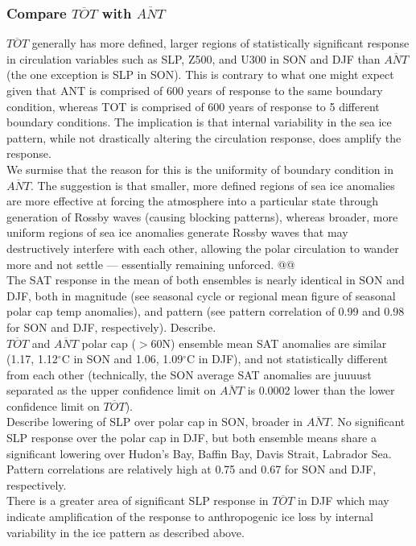 \documentclass[twocol]{ametsoc}
\begin{document}
\subsubsection{Compare $\overline{TOT}$ with $\overline{ANT}$}

$\overline{TOT}$ generally has more defined, larger regions of statistically significant response in circulation variables such as SLP, Z500, and U300 in SON and DJF than $\overline{ANT}$ (the one exception is SLP in SON). This is contrary to what one might expect given that ANT is comprised of 600 years of response to the same boundary condition, whereas TOT is comprised of 600 years of response to 5 different boundary conditions. The implication is that internal variability in the sea ice pattern, while not drastically altering the circulation response, does amplify the response.\\

We surmise that the reason for this is the uniformity of boundary condition in $\overline{ANT}$. The suggestion is that smaller, more defined regions of sea ice anomalies are more effective at forcing the atmosphere into a particular state through generation of Rossby waves (causing blocking patterns), whereas broader, more uniform regions of sea ice anomalies generate Rossby waves that may destructively interfere with each other, allowing the polar circulation to wander more and not settle --- essentially remaining unforced. @@\\

The SAT response in the mean of both ensembles is nearly identical in SON and DJF, both in magnitude (see seasonal cycle or regional mean figure of seasonal polar cap temp anomalies), and pattern (see pattern correlation of 0.99 and 0.98 for SON and DJF, respectively). Describe.\\
$\overline{TOT}$ and $\overline{ANT}$ polar cap ($>$60N) ensemble mean SAT anomalies are similar (1.17, 1.12$^\circ$C in SON and 1.06, 1.09$^\circ$C in DJF), and not statistically different from each other (technically, the SON average SAT anomalies are juuuust separated as the upper confidence limit on $\overline{ANT}$ is 0.0002 lower than the lower confidence limit on $\overline{TOT}$).\\ 

Describe lowering of SLP over polar cap in SON, broader in $\overline{ANT}$. No significant SLP response over the polar cap in DJF, but both ensemble means share a significant lowering over Hudon's Bay, Baffin Bay, Davis Strait, Labrador Sea. Pattern correlations are relatively high at 0.75 and 0.67 for SON and DJF, respectively.\\
There is a greater area of significant SLP response in $\overline{TOT}$ in DJF which may indicate amplification of the response to anthropogenic ice loss by internal variability in the ice pattern as described above.\\
\end{document}
